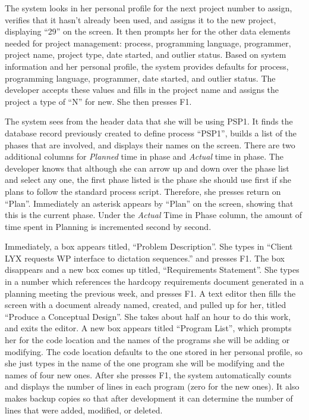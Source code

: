 The system looks in her personal profile for the next project number to
assign, verifies that it hasn't already been used, and assigns it to the
new project, displaying ``29'' on the screen. It then prompts her for the
other data elements needed for project management: process, programming
language, programmer, project name, project type, date started, and outlier
status.  Based on system information and her personal profile, the system
provides defaults for process, programming language, programmer, date
started, and outlier status.  The developer accepts these values and fills
in the project name and assigns the project a type of ``N'' for new.  She
then presses F1.

The system sees from the header data that she will be using PSP1.  It finds
the database record previously created to define process ``PSP1'', builds a
list of the phases that are involved, and displays their names on the
screen.  There are two additional columns for {\it Planned} time in phase
and {\it Actual} time in phase.  The developer knows that although she can
arrow up and down over the phase list and select any one, the first phase
listed is the phase she should use first if she plans to follow the
standard process script.  Therefore, she presses return on ``Plan''.
Immediately an asterisk appears by ``Plan'' on the screen, showing that
this is the current phase.  Under the {\it Actual} Time in Phase column,
the amount of time spent in Planning is incremented second by second.

Immediately, a box appears titled, ``Problem Description''.  She types in
``Client LYX requests WP interface to dictation sequences.'' and presses
F1.  The box disappears and a new box comes up titled, ``Requirements
Statement''.  She types in a number which references the hardcopy
requirements document generated in a planning meeting the previous week,
and presses F1.  A text editor then fills the screen with a document
already named, created, and pulled up for her, titled ``Produce a
Conceptual Design''.  She takes about half an hour to do this work, and
exits the editor. A new box appears titled ``Program List'', which prompts
her for the code location and the names of the programs she will be adding
or modifying.  The code location defaults to the one stored in her personal
profile, so she just types in the name of the one program she will be
modifying and the names of four new ones. After she presses F1, the system
automatically counts and displays the number of lines in each program (zero
for the new ones).  It also makes backup copies so that after development
it can determine the number of lines that were added, modified, or deleted.


